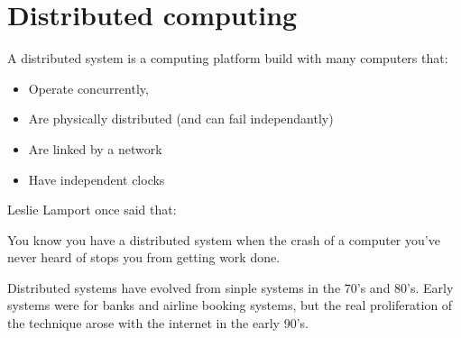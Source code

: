 
\section{Distributed computing}

A distributed system is a computing platform build with many computers that:

\begin{itemize}
  \item Operate concurrently,
  \item Are physically distributed (and can fail independantly)
  \item Are linked by a network
  \item Have independent clocks
\end{itemize}

Leslie Lamport once said that:


You know you have a distributed system when the crash of a computer you've never
heard of stops you from getting work done.

Distributed systems have evolved from sinple systems in the 70's and 80's. Early
systems were for banks and airline booking systems, but the real proliferation
of the technique arose with the internet in the early 90's.

